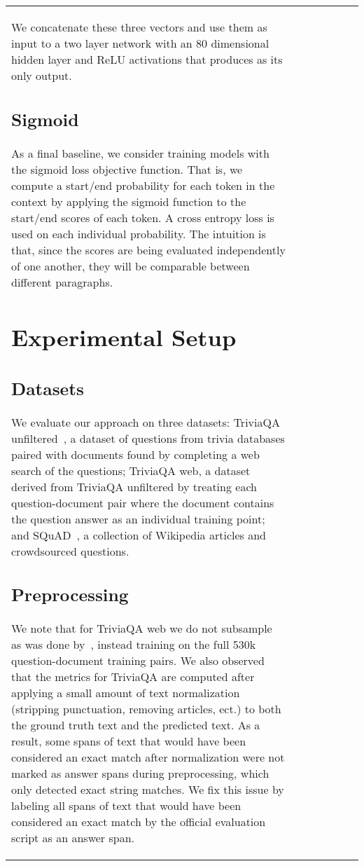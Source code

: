 \documentclass[11pt,a4paper]{article}
\begin{document}
\begin{table*}
\begin{small}
\begin{center}
\begin{tabular}{ | l | l | l | c | l | l | c |}
We concatenate these three vectors and use them as input to a two layer network with an 80 dimensional hidden layer and ReLU activations that produces  as its only output.

\subsection{Sigmoid}
As a final baseline, we consider training models with the sigmoid loss objective function. That is, we compute a start/end probability for each token in the context by applying the sigmoid function to the start/end scores of each token. A cross entropy loss is used on each individual probability. The intuition is that, since the scores are being evaluated independently of one another, they will be comparable between different paragraphs. 


\section{Experimental Setup}
\subsection{Datasets}
We evaluate our approach on three datasets: TriviaQA unfiltered~\cite{triviaqa}, a dataset of questions from trivia databases paired with documents found by completing a web search of the questions; TriviaQA web, a dataset derived from TriviaQA unfiltered by treating each question-document pair where the document contains the question answer as an individual training point; and SQuAD~\cite{squad}, a collection of Wikipedia articles and crowdsourced questions. 

\subsection{Preprocessing}
We note that for TriviaQA web we do not subsample as was done by~\citet{triviaqa}, instead training on the full 530k question-document training pairs. We also observed that the metrics for TriviaQA are computed after applying a small amount of text normalization (stripping punctuation, removing articles, ect.) to both the ground truth text and the predicted text. As a result, some spans of text that would have been considered an exact match after normalization were not marked as answer spans during preprocessing, which only detected exact string matches. We fix this issue by labeling all spans of text that would have been considered an exact match by the official evaluation script as an answer span.


\end{tabular}
\end{center}
\end{small}
\end{table*}
\end{document}

